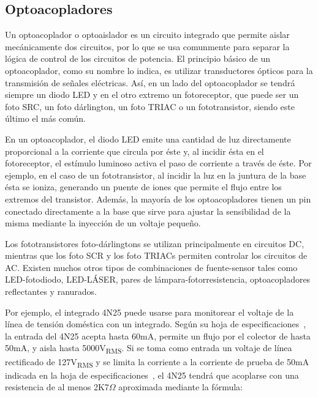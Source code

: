 %
%


\subsection{Optoacopladores}%
\label{seq:intro-opto}
Un optoacoplador o optoaislador es un circuito integrado que permite aislar mecánicamente dos circuitos, por lo que se usa comunmente para separar la lógica de control de los circuitos de potencia.
El principio básico de un optoacoplador, como su nombre lo indica, es utilizar transductores ópticos para la transmisión de señales eléctricas.
Así, en un lado del optoacoplador se tendrá siempre un diodo LED y en el otro extremo un fotoreceptor, que puede ser un foto SRC, un foto dárlington, un foto TRIAC o un fototransistor, siendo este último el más común.

En un optoacoplador, el diodo LED emite una cantidad de luz directamente proporcional a la corriente que circula por éste y, al incidir ésta en el fotoreceptor, el estímulo luminoso activa el paso de corriente a través de éste.
Por ejemplo, en el caso de un fototransistor, al incidir la luz en la juntura de la base ésta se ioniza, generando un puente de iones que permite el flujo entre los extremos del transistor.
Además, la mayoría de los optoacopladores tienen un pin conectado directamente a la base que sirve para ajustar la sensibilidad de la misma mediante la inyección de un voltaje pequeño.

Los fototransistores foto-dárlingtons se utilizan principalmente en circuitos DC, mientras que los foto SCR y los foto TRIACs permiten controlar los circuitos de AC.
Existen muchos otros tipos de combinaciones de fuente-sensor tales como LED-fotodiodo, LED-LÁSER, pares de lámpara-fotorresistencia, optoacopladores reflectantes y ranurados.

Por ejemplo, el integrado 4N25 puede usarse para monitorear el voltaje de la línea de tensión doméstica con un integrado.
Según su hoja de especificaciones~, la entrada del 4N25 acepta hasta 60mA, permite un flujo por el colector de hasta 50mA, y aisla hasta 5000V\textsubscript{RMS}.
Si se toma como entrada un voltaje de línea rectificado de 127V\textsubscript{RMS} y se limita la corriente a la corriente de prueba de 50mA indicada en la hoja de especificaciones~, el 4N25 tendrá que acoplarse con una resistencia de al menos 2K7$\Omega$ aproximada mediante la fórmula:

